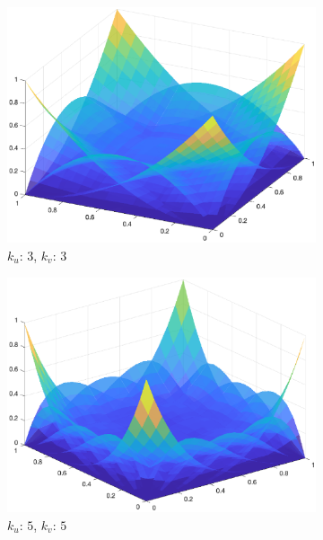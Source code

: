 \documentclass[a4paper, 12pt]{article}
\begin{document}
\begin{figure}[]
  \centering
  \begin{subfigure}[b]{0.3\textwidth}
    \includegraphics[width=\textwidth]{figure/bezier_surface_basis33_1.eps}
    \caption{$k_u$: $3$, $k_v$: $3$}
    \label{fig:bezier_surface_basis33_1}
  \end{subfigure}
  \begin{subfigure}[b]{0.3\textwidth}
      \includegraphics[width=\textwidth]{figure/bezier_surface_basis55_1.eps}
      \caption{$k_u$: $5$, $k_v$: $5$}
      \label{fig:bezier_surface_basis55_1}
  \end{subfigure}
  \begin{subfigure}[b]{0.3\textwidth}

\end{subfigure}
\end{figure}
\end{document}
